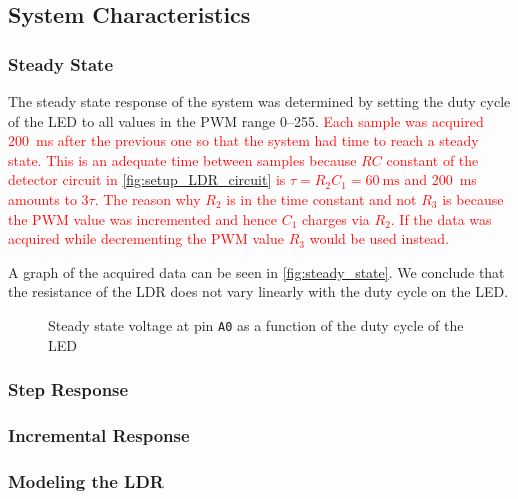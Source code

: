 \subsection{System Characteristics}
\label{sec:SystemCharacteristics}

\subsubsection{Steady State}
\label{sub:SteadyState}

The steady state response of the system was determined by setting the duty cycle of the LED to all values in the PWM range 0--255. \textcolor{red}{Each sample was acquired \SI{200}{\milli\second} after the previous one so that the system had time to reach a steady state. This is an adequate time between samples because $RC$ constant of the detector circuit in \autoref{fig:setup_LDR_circuit} is $\tau = R_2C_1 = \SI{60}{\milli\second}$ and \SI{200}{\milli\second} amounts to $3\tau$. The reason why $R_2$ is in the time constant and not $R_3$ is because the PWM value was incremented and hence $C_1$ charges via $R_2$. If the data was acquired while decrementing the PWM value $R_3$ would be used instead.}


A graph of the acquired data can be seen in \autoref{fig:steady_state}. We conclude that the resistance of the LDR does not vary linearly with the duty cycle on the LED.

\begin{figure}[h]
    \centering
    \resizebox{\textwidth}{!}{}
    \caption{Steady state voltage at pin \texttt{A0} as a function of the duty cycle of the LED}
    \label{fig:steady_state}
\end{figure}

\subsubsection{Step Response}
\label{sub:StepResponse}

\subsubsection{Incremental Response}
\label{sub:IncrementalResponse}

\subsubsection{Modeling the LDR}
\label{subsubsec:LDR_model}


